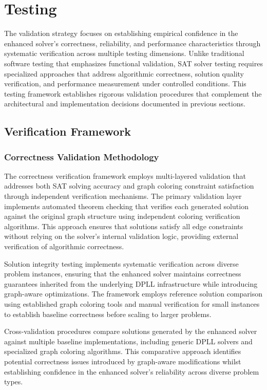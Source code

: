\section{Testing}

The validation strategy focuses on establishing empirical confidence in the enhanced solver's correctness, reliability, and performance characteristics through systematic verification across multiple testing dimensions. Unlike traditional software testing that emphasizes functional validation, SAT solver testing requires specialized approaches that address algorithmic correctness, solution quality verification, and performance measurement under controlled conditions. This testing framework establishes rigorous validation procedures that complement the architectural and implementation decisions documented in previous sections.

\subsection{Verification Framework}

\subsubsection{Correctness Validation Methodology}
The correctness verification framework employs multi-layered validation that addresses both SAT solving accuracy and graph coloring constraint satisfaction through independent verification mechanisms. The primary validation layer implements automated theorem checking that verifies each generated solution against the original graph structure using independent coloring verification algorithms. This approach ensures that solutions satisfy all edge constraints without relying on the solver's internal validation logic, providing external verification of algorithmic correctness.

Solution integrity testing implements systematic verification across diverse problem instances, ensuring that the enhanced solver maintains correctness guarantees inherited from the underlying DPLL infrastructure while introducing graph-aware optimizations. The framework employs reference solution comparison using established graph coloring tools and manual verification for small instances to establish baseline correctness before scaling to larger problems.

Cross-validation procedures compare solutions generated by the enhanced solver against multiple baseline implementations, including generic DPLL solvers and specialized graph coloring algorithms. This comparative approach identifies potential correctness issues introduced by graph-aware modifications whilst establishing confidence in the enhanced solver's reliability across diverse problem types.

